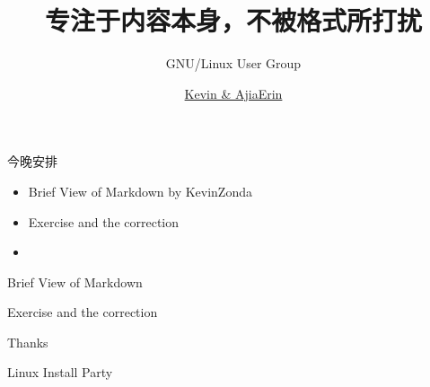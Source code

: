 \documentclass[10pt]{ctexbeamer}
\title[LITLUG Beamer (\LaTeX{})]{专注于内容本身，不被格式所打扰}
\subtitle[]{GNU/Linux User Group}
\author[AjiaErin]{\href{mailto:icpove@gmail.com}{ Kevin \& AjiaErin }}
\institute{MarkDown \ \raisebox{0.5mm}{------} \ 5分钟入门，10分钟精通}
\begin{document}
\begin{frame}[plain]
  \maketitle
\end{frame}
\begin{frame}{今晚安排}
\begin{itemize}
    \item \quad\alert{Brief View of Markdown by KevinZonda}
    \item \quad\alert{Exercise and the correction}
    \item\quad{}
\end{itemize}
\end{frame}
\begin{frame}[plain]
  \vfill
  \centerline{\Huge Brief View of Markdown}
  \vfill
\end{frame}
\begin{frame}[plain]
  \vfill
  \centerline{\Huge Exercise and the correction}
  \vfill
\end{frame}
\begin{frame}[plain]
  \vfill
  \centerline{\Huge Thanks}
  \vfill
\end{frame}
\begin{frame}[plain]
  \vfill
  \centerline{\Huge Linux Install Party}
  \vfill
\end{frame}
\end{document}
